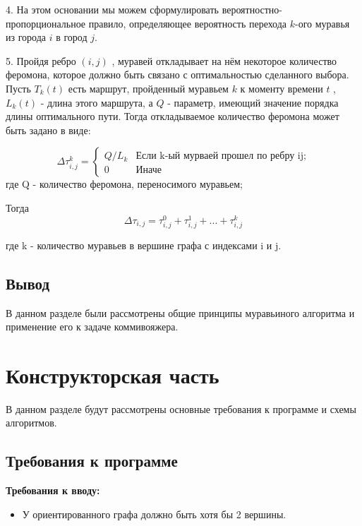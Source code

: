 \documentclass[12pt]{report}
\begin{document}
4. На этом основании мы можем сформулировать вероятностно-пропорциональное правило, определяющее вероятность перехода $k$-ого муравья из города $i$  в город $j$. 

5. Пройдя ребро $(i,j)$ , муравей откладывает на нём некоторое количество феромона, которое должно быть связано с оптимальностью сделанного выбора. Пусть $T _{k} (t)$ есть маршрут, пройденный муравьем $k$ к моменту времени $t$ , $L _{k} (t)$ - длина этого маршрута, а $Q$ - параметр, имеющий значение порядка длины оптимального пути. Тогда откладываемое количество феромона может быть задано в виде:

\begin{equation}\label{form:add} 
{\displaystyle \Delta \tau _{i,j}^k={\begin{cases}Q/L_{k}& {\mbox{Если k-ый мурваей прошел по ребру ij;}}\\0&{\mbox{Иначе}}\end{cases}}}
\end{equation}
где \quad Q - количество феромона, переносимого муравьем;

Тогда
\begin{equation}\label{form:add1} 
\Delta \tau _{i,j}= \tau _{i,j}^0 + \tau _{i,j}^1 + ... + \tau _{i,j}^k 
\end{equation}

где k - количество муравьев в вершине графа с индексами i и j.
\section*{Вывод}
В данном разделе были рассмотрены общие принципы муравьиного алгоритма и применение его к задаче коммивояжера. 


\chapter{Конструкторская часть}
В данном разделе будут рассмотрены основные требования к программе и схемы алгоритмов.

\section{Требования к программе}
\textbf{Требования к вводу:}
\begin{itemize}
	\item У ориентированного графа должно быть хотя бы 2 вершины.
\end{itemize}
\end{document}
